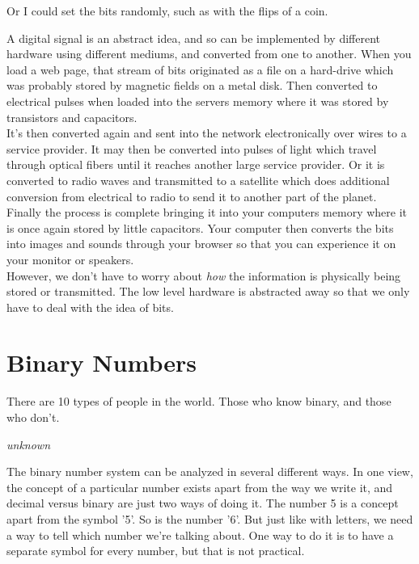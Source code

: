 \begin{center}\end{center}

Or I could set the bits randomly, such as with the flips of a coin.

\begin{center}\end{center}

A digital signal is an abstract idea, and so can be implemented by different hardware using different mediums, and converted from one to another. When you load a web page, that stream of bits originated as a file on a hard-drive which was probably stored by magnetic fields on a metal disk. Then converted to electrical pulses when loaded into the servers memory where it was stored by transistors and capacitors.\\

It's then converted again and sent into the network electronically over wires to a service provider. It may then be converted into pulses of light which travel through optical fibers until it reaches another large service provider. Or it is converted to radio waves and transmitted to a satellite which does additional conversion from electrical to radio to send it to another part of the planet. Finally the process is complete bringing it into your computers memory where it is once again stored by little capacitors. Your computer then converts the bits into images and sounds through your browser so that you can experience it on your monitor or speakers.\\

However, we don't have to worry about \textit{how} the information is physically being stored or transmitted. The low level hardware is abstracted away so that we only have to deal with the idea of bits.

\section{Binary Numbers}


\epigraph{There are 10 types of people in the world. Those who know binary, and those who don't.}{\textit{unknown}}

The binary number system can be analyzed in several different ways. In one view, the concept of a particular number exists apart from the way we write it, and decimal versus binary are just two ways of doing it. The number 5 is a concept apart from the symbol '5'. So is the number '6'. But just like with letters, we need a way to tell which number we're talking about. One way to do it is to have a separate symbol for every number, but that is not practical.\\

